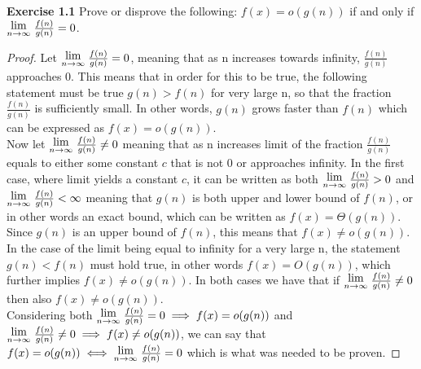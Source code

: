 \documentclass{article}
\newcommand{\Lim}[1]{\raisebox{0.5ex}{{$\displaystyle \lim_{#1}\;$}}}
\newcommand{\subtitle}[1]{%
  \posttitle{%
    \par\end{center}
    \begin{center}\LARGE#1\end{center}
    \vskip0.5em}%
}
\begin{document}
\subtitle{Lecture I}
\noindent \textbf{Exercise 1.1} Prove or disprove the following: $f(x) = o(g(n))$ if and only if $\Lim{n \to \infty} \frac{f(n)}{g(n)}=0$.
\begin{proof}
  Let $\Lim{n \to \infty} \frac{f(n)}{g(n)}=0$, meaning that as n increases towards infinity, $\frac{f(n)}{g(n)}$ approaches 0. This means that in order for this to be true, the following statement must be true $g(n) > f(n)$ for very large n, so that the fraction $\frac{f(n)}{g(n)}$ is sufficiently small. In other words, $g(n)$ grows faster than $f(n)$ which can be expressed as $f(x) = o(g(n))$. \\
  
  Now let $\Lim{n \to \infty} \frac{f(n)}{g(n)}\neq0$ meaning that as n increases limit of the fraction $\frac{f(n)}{g(n)}$ equals to either some constant $c$ that is not 0 or approaches infinity. In the first case, where limit yields a constant $c$, it can be written as both $\Lim{n \to \infty} \frac{f(n)}{g(n)}>0$ and $\Lim{n \to \infty} \frac{f(n)}{g(n)}<\infty$ meaning that $g(n)$ is both upper and lower bound of $f(n)$, or in other words an exact bound, which can be written as $f(x) = \Theta(g(n))$. Since $g(n)$ is an upper bound of $f(n)$, this means that $f(x) \neq o(g(n))$. In the case of the limit being equal to infinity for a very large n, the statement $g(n) < f(n)$ must hold true, in other words $f(x) = O(g(n))$, which further implies $f(x) \neq o(g(n))$. In both cases we have that if $\Lim{n \to \infty} \frac{f(n)}{g(n)}\neq0$ then also $f(x) \neq o(g(n))$. \\
  
  Considering both $\Lim{n \to \infty} \frac{f(n)}{g(n)}=0 \implies f(x) = o(g(n))$ and $\Lim{n \to \infty} \frac{f(n)}{g(n)}\neq0 \implies f(x) \neq o(g(n))$, we can say that $f(x) = o(g(n)) \iff \Lim{n \to \infty} \frac{f(n)}{g(n)}=0$ which is what was needed to be proven.

\end{proof}
\end{document}
